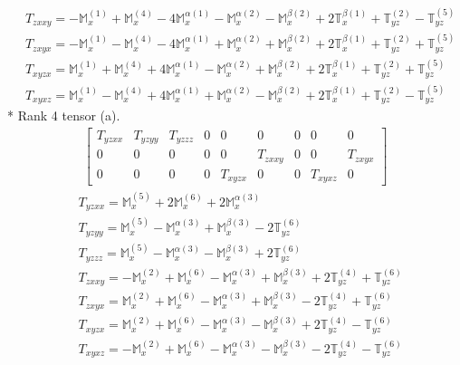 \documentclass[fleqn,8pt,landscape]{jsarticle}
\begin{document}
\begin{align*}
& T_{zxxy} = - \mathbb{M}_{x}^{(1)} + \mathbb{M}_{x}^{(4)} - 4 \mathbb{M}_{x}^{\alpha(1)} - \mathbb{M}_{x}^{\alpha(2)} - \mathbb{M}_{x}^{\beta(2)} + 2 \mathbb{T}_{x}^{\beta(1)} + \mathbb{T}_{yz}^{(2)} - \mathbb{T}_{yz}^{(5)} \\
& T_{zxyx} = - \mathbb{M}_{x}^{(1)} - \mathbb{M}_{x}^{(4)} - 4 \mathbb{M}_{x}^{\alpha(1)} + \mathbb{M}_{x}^{\alpha(2)} + \mathbb{M}_{x}^{\beta(2)} + 2 \mathbb{T}_{x}^{\beta(1)} + \mathbb{T}_{yz}^{(2)} + \mathbb{T}_{yz}^{(5)} \\
& T_{xyzx} = \mathbb{M}_{x}^{(1)} + \mathbb{M}_{x}^{(4)} + 4 \mathbb{M}_{x}^{\alpha(1)} - \mathbb{M}_{x}^{\alpha(2)} + \mathbb{M}_{x}^{\beta(2)} + 2 \mathbb{T}_{x}^{\beta(1)} + \mathbb{T}_{yz}^{(2)} + \mathbb{T}_{yz}^{(5)} \\
& T_{xyxz} = \mathbb{M}_{x}^{(1)} - \mathbb{M}_{x}^{(4)} + 4 \mathbb{M}_{x}^{\alpha(1)} + \mathbb{M}_{x}^{\alpha(2)} - \mathbb{M}_{x}^{\beta(2)} + 2 \mathbb{T}_{x}^{\beta(1)} + \mathbb{T}_{yz}^{(2)} - \mathbb{T}_{yz}^{(5)}
\end{align*}
* Rank 4 tensor (a).
\begin{align*}
\begin{bmatrix} T_{yzxx} & T_{yzyy} & T_{yzzz} & 0 & 0 & 0 & 0 & 0 & 0 \\ 0 & 0 & 0 & 0 & 0 & T_{zxxy} & 0 & 0 & T_{zxyx} \\ 0 & 0 & 0 & 0 & T_{xyzx} & 0 & 0 & T_{xyxz} & 0 \end{bmatrix}
\end{align*}
\begin{align*}
& T_{yzxx} = \mathbb{M}_{x}^{(5)} + 2 \mathbb{M}_{x}^{(6)} + 2 \mathbb{M}_{x}^{\alpha(3)} \\
& T_{yzyy} = \mathbb{M}_{x}^{(5)} - \mathbb{M}_{x}^{\alpha(3)} + \mathbb{M}_{x}^{\beta(3)} - 2 \mathbb{T}_{yz}^{(6)} \\
& T_{yzzz} = \mathbb{M}_{x}^{(5)} - \mathbb{M}_{x}^{\alpha(3)} - \mathbb{M}_{x}^{\beta(3)} + 2 \mathbb{T}_{yz}^{(6)} \\
& T_{zxxy} = - \mathbb{M}_{x}^{(2)} + \mathbb{M}_{x}^{(6)} - \mathbb{M}_{x}^{\alpha(3)} + \mathbb{M}_{x}^{\beta(3)} + 2 \mathbb{T}_{yz}^{(4)} + \mathbb{T}_{yz}^{(6)} \\
& T_{zxyx} = \mathbb{M}_{x}^{(2)} + \mathbb{M}_{x}^{(6)} - \mathbb{M}_{x}^{\alpha(3)} + \mathbb{M}_{x}^{\beta(3)} - 2 \mathbb{T}_{yz}^{(4)} + \mathbb{T}_{yz}^{(6)} \\
& T_{xyzx} = \mathbb{M}_{x}^{(2)} + \mathbb{M}_{x}^{(6)} - \mathbb{M}_{x}^{\alpha(3)} - \mathbb{M}_{x}^{\beta(3)} + 2 \mathbb{T}_{yz}^{(4)} - \mathbb{T}_{yz}^{(6)} \\
& T_{xyxz} = - \mathbb{M}_{x}^{(2)} + \mathbb{M}_{x}^{(6)} - \mathbb{M}_{x}^{\alpha(3)} - \mathbb{M}_{x}^{\beta(3)} - 2 \mathbb{T}_{yz}^{(4)} - \mathbb{T}_{yz}^{(6)}
\end{align*}
\end{document}
